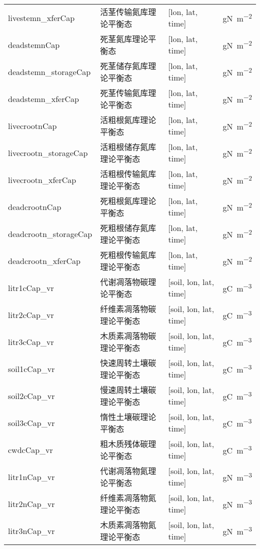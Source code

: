 {\begin{longtable}[htbp]{lp{}ll}
livestemn\_xferCap   & 活茎传输氮库理论平衡态 & {[}lon, lat, time{]} & \unit{gN.m^{-2}} \\
deadstemnCap      & 死茎氮库理论平衡态 & {[}lon, lat, time{]}  & \unit{gN.m^{-2}} \\
deadstemn\_storageCap  & 死茎储存氮库理论平衡态 & {[}lon, lat, time{]} & \unit{gN.m^{-2}} \\
deadstemn\_xferCap   & 死茎传输氮库理论平衡态 & {[}lon, lat, time{]} & \unit{gN.m^{-2}} \\
livecrootnCap & 活粗根氮库理论平衡态 & {[}lon, lat, time{]}  & \unit{gN.m^{-2}} \\
livecrootn\_storageCap & 活粗根储存氮库理论平衡态 & {[}lon, lat, time{]} & \unit{gN.m^{-2}} \\
livecrootn\_xferCap & 活粗根传输氮库理论平衡态 & {[}lon, lat, time{]}  & \unit{gN.m^{-2}} \\
deadcrootnCap & 死粗根氮库理论平衡态 & {[}lon, lat, time{]}  & \unit{gN.m^{-2}} \\
deadcrootn\_storageCap & 死粗根储存氮库理论平衡态 & {[}lon, lat, time{]} & \unit{gN.m^{-2}} \\
deadcrootn\_xferCap & 死粗根传输氮库理论平衡态 & {[}lon, lat, time{]}  & \unit{gN.m^{-2}} \\
litr1cCap\_vr & 代谢凋落物碳理论平衡态 & {[}soil, lon, lat, time{]}  & \unit{gC.m^{-3}} \\
litr2cCap\_vr & 纤维素凋落物碳理论平衡态 & {[}soil, lon, lat, time{]}  & \unit{gC.m^{-3}} \\
litr3cCap\_vr & 木质素凋落物碳理论平衡态 & {[}soil, lon, lat, time{]}  & \unit{gC.m^{-3}} \\
soil1cCap\_vr & 快速周转土壤碳理论平衡态 & {[}soil, lon, lat, time{]}  & \unit{gC.m^{-3}} \\
soil2cCap\_vr & 慢速周转土壤碳理论平衡态 & {[}soil, lon, lat, time{]}  & \unit{gC.m^{-3}} \\
soil3cCap\_vr & 惰性土壤碳理论平衡态 & {[}soil, lon, lat, time{]}  & \unit{gC.m^{-3}} \\
cwdcCap\_vr & 粗木质残体碳理论平衡态 & {[}soil, lon, lat, time{]}  & \unit{gC.m^{-3}} \\
litr1nCap\_vr & 代谢凋落物氮理论平衡态 & {[}soil, lon, lat, time{]}  & \unit{gN.m^{-3}} \\
litr2nCap\_vr & 纤维素凋落物氮理论平衡态 & {[}soil, lon, lat, time{]}  & \unit{gN.m^{-3}} \\
litr3nCap\_vr & 木质素凋落物氮理论平衡态 & {[}soil, lon, lat, time{]}  & \unit{gN.m^{-3}} \\

\end{longtable}}
